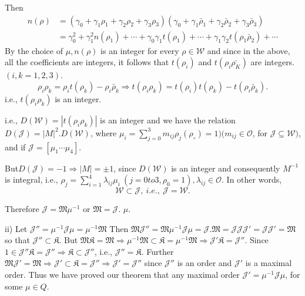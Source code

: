 Then 
  \begin{align*}
    n(\rho) & = (\gamma_0 + \gamma_1 \rho_1 + \gamma_2 \rho_2 + \gamma_3
    \rho_3) ( \gamma_0 + \gamma_1 \bar{\rho}_1 + \gamma_2 \bar{\rho}_2
    + \gamma_3 \bar{\rho}_3)\\ 
    & = \gamma^2_0 + \gamma^2_1 n(\rho_1) + \cdots + \gamma_0 \gamma_1
    t(\rho_1) + \cdots + \gamma_1 \gamma_2 t(\rho_1 \bar{\rho}_2)+
    \cdots 
  \end{align*}
  By the choice of $\mu,  n(\rho)$ is an integer for every $\rho \in
  \mathcal{W}$ and since in the above, all the coefficients are
  integers, it follows that $t(\rho_i)$ and $t(\rho_i \bar{\rho_K})$
  are integers. $(i, k = 1, 2, 3)$. 
  $$
  \rho_i \rho_k = \rho_i t(\rho_k) - \rho_i \bar{\rho}_k \Rightarrow
  t(\rho_i \rho_k) = t(\rho_i) t(\rho_k) - t(\rho_i \bar{\rho}_k). 
  $$
  i.e., $t(\rho_i \rho_k)$ is an integer.
  
  i.e., $D(\mathcal{W}) = |t(\rho_i \rho_k)|$ is an integer and we
  have the relation $D(\mathcal{J}) = |M|^2.  D (\mathcal{W})$, where
  $\mu_i = \sum \limits^3_{j=0} m_{ij} \rho_j (\rho_\circ) = 1) (m_{ij} \in
  \mathscr{O}$, for $\mathcal{J} \subseteq \mathcal{W})$, and if
  $\mathcal{J}= [ \mu_1 \cdots \mu_4]$. 
  
  But\pageoriginale $D(\mathcal{J}) = -1 \Rightarrow |M| = \pm 1$, since
  $D(\mathcal{W})$ is an integer and consequently $M^{-1}$ is
  integral, i.e., $\rho_j = \sum \limits^4_{i=1} \lambda_{ij} \mu_i~
  (j=0 to 3, \rho_0 =1), \lambda_{ij} \in \mathscr{O}$. In other
  words, 
  $$
  \mathcal{W} \subset \mathcal{J},  ~ i.e., ~ \mathcal{J} = \mathcal{W}.
  $$  
  
  Therefore $\mathcal{J} = \mathfrak{M} \mu^{-1}$ or $\mathfrak{M} =
  \mathcal{J}$. $\mu$.  

 ii) Let $\mathcal{J}'' = \mu^{-1} \mathcal{J} \mu =
 \mu^{-1} \mathfrak{M}$ Then $\mathfrak{M} \mathcal{J}'' = \mathfrak{M}
 \mu^{-1} \mathcal{J} \mu = \mathcal{J}. \mathfrak{M} = \mathcal{J}
 \mathcal{J} \mathcal{J}'= \mathcal{J} \mathcal{J}' = \mathfrak{M}$ so
 that $\mathcal{J}'' \subset \mathfrak{K}$. But $\mathfrak{M}
 \mathfrak{K} = \mathfrak{M} \Rightarrow \mu^{-1} \mathfrak{M} \subset
 \mathfrak{K} = \mu^{-1}  \mathfrak{M} \Rightarrow \mathcal{J}'
 \mathfrak{K} = \mathcal{J}''$. Since $1 \in \mathcal{J}'' \mathfrak{K}
 = \mathcal{J}'' \Rightarrow \mathfrak{K} \subset\mathcal{J}''$, i.e.,
 $\mathcal{J}'' = \mathfrak{K}$. Further $\mathfrak{M} \mathcal{J}' =
 \mathfrak{M} \Rightarrow \mathcal{J}'\subset \mathfrak{K} =
 \mathcal{J}'' \Rightarrow \mathcal{J}'=\mathcal{J}''$ since
 $\mathcal{J}''$ is an order and $\mathcal{J}'$ is a maximal
 order. Thus we have proved our theorem that any maximal order
 $\mathcal{J}' = \mu^{-1} \mathcal{J} \mu$, for some $\mu \in Q$. 
  
